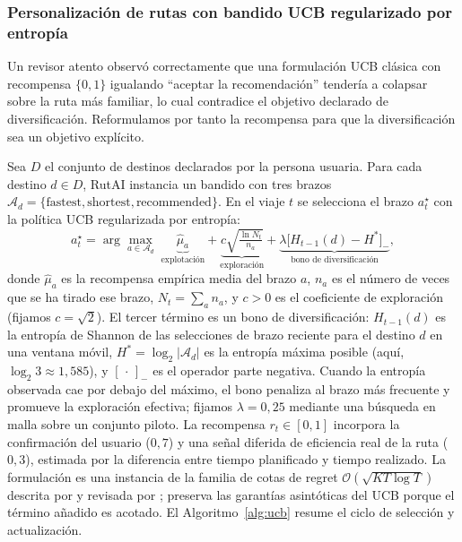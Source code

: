 \documentclass[a4paper,fleqn]{cas-sc}
\newcommand{\RUTAI}{RutAI\xspace}
\newcommand{\UCB}{UCB\xspace}
\begin{document}
	\subsubsection{Personalizaci\'on de rutas con bandido UCB regularizado por entrop\'ia}\label{sec:ucb}
	
	Un revisor atento observ\'o correctamente que una formulaci\'on \UCB cl\'asica con recompensa $\{0,1\}$ igualando ``aceptar la recomendaci\'on'' tender\'ia a colapsar sobre la ruta m\'as familiar, lo cual contradice el objetivo declarado de diversificaci\'on. Reformulamos por tanto la recompensa para que la diversificaci\'on sea un objetivo expl\'icito.
	
	Sea $D$ el conjunto de destinos declarados por la persona usuaria. Para cada destino $d \in D$, \RUTAI instancia un bandido con tres brazos $\mathcal{A}_d=\{\text{fastest},\text{shortest},\text{recommended}\}$. En el viaje $t$ se selecciona el brazo $a^\star_t$ con la pol\'itica \UCB regularizada por entrop\'ia:
	\begin{equation}\label{eq:ucb}
		a^\star_t = \arg\max_{a\in\mathcal{A}_d}\;
		\underbrace{\hat{\mu}_{a}}_{\text{explotaci\'on}}
		+\underbrace{c\sqrt{\tfrac{\ln N_t}{n_a}}}_{\text{exploraci\'on}}
		+\underbrace{\lambda\bigl[H_{t-1}(d) - H^{\ast}\bigr]_{-}}_{\text{bono de diversificaci\'on}},
	\end{equation}
	donde $\hat{\mu}_a$ es la recompensa emp\'irica media del brazo $a$, $n_a$ es el n\'umero de veces que se ha tirado ese brazo, $N_t=\sum_a n_a$, y $c>0$ es el coeficiente de exploraci\'on (fijamos $c=\sqrt{2}$). El tercer t\'ermino es un bono de diversificaci\'on: $H_{t-1}(d)$ es la entrop\'ia de Shannon \citep{shannon1948entropy} de las selecciones de brazo reciente para el destino $d$ en una ventana m\'ovil, $H^\ast = \log_2 |\mathcal{A}_d|$ es la entrop\'ia m\'axima posible (aqu\'i, $\log_2 3 \approx 1{,}585$), y $[\,\cdot\,]_{-}$ es el operador parte negativa. Cuando la entrop\'ia observada cae por debajo del m\'aximo, el bono penaliza al brazo m\'as frecuente y promueve la exploraci\'on efectiva; fijamos $\lambda=0{,}25$ mediante una b\'usqueda en malla sobre un conjunto piloto. La recompensa $r_t \in [0,1]$ incorpora la confirmaci\'on del usuario ($0{,}7$) y una se\~nal diferida de eficiencia real de la ruta ($0{,}3$), estimada por la diferencia entre tiempo planificado y tiempo realizado. La formulaci\'on es una instancia de la familia de cotas de regret $\mathcal{O}(\sqrt{KT\log T})$ descrita por \citet{auer2002ucb} y revisada por \citet{bouneffouf2020mabsurvey}; preserva las garant\'ias asint\'oticas del \UCB porque el t\'ermino a\~nadido es acotado. El Algoritmo~\ref{alg:ucb} resume el ciclo de selecci\'on y actualizaci\'on.
	
\end{document}
